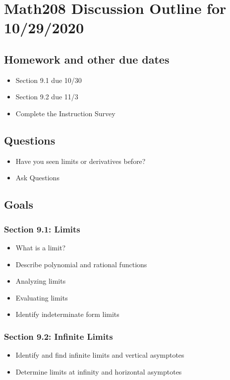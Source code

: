 \documentclass[14pt]{extarticle}
\begin{document}
\section*{Math208 Discussion Outline for 10/29/2020}

\subsection{Homework and other due dates}
\begin{itemize}
\item Section 9.1 due 10/30
\item Section 9.2 due 11/3
\item Complete the Instruction Survey
\end{itemize}

\subsection{Questions}
\begin{itemize}
	\item Have you seen limits or derivatives before?
	\item Ask Questions
\end{itemize}

\subsection{Goals}
\subsubsection*{Section 9.1: Limits}
\begin{itemize}
	\item What is a limit?
	\item Describe polynomial and rational functions
	\item Analyzing limits
	\item Evaluating limits
	\item Identify indeterminate form limits
\end{itemize}

\subsubsection*{Section 9.2: Infinite Limits}
\begin{itemize}
	\item Identify and find infinite limits and vertical asymptotes
	\item Determine limits at infinity and horizontal asymptotes
\end{itemize}
\end{document}
